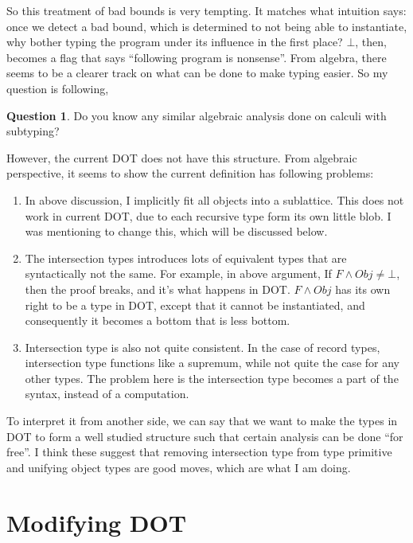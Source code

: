 \documentclass{article}
\theoremstyle{definition}
\newtheorem{question}{Question}
\begin{document}
So this treatment of bad bounds is very tempting. It matches what intuition says: once
we detect a bad bound, which is determined to not being able to instantiate, why
bother typing the program under its influence in the first place? $\bot$, then,
becomes a flag that says ``following program is nonsense''. From algebra, there seems
to be a clearer track on what can be done to make typing easier. So my question is
following,

\begin{question}
Do you know any similar algebraic analysis done on calculi with subtyping?
\end{question}

However, the current DOT does not have this structure. From algebraic perspective, it
seems to show the current definition has following problems:

\begin{enumerate}
\item In above discussion, I implicitly fit all objects into a sublattice. This does
  not work in current DOT, due to each recursive type form its own little blob. I was
  mentioning to change this, which will be discussed below.
  
\item The intersection types introduces lots of equivalent types that are
  syntactically not the same. For example, in above argument, If $F \wedge Obj \neq
  \bot$, then the proof breaks, and it's what happens in DOT. $F \wedge Obj$ has its
  own right to be a type in DOT, except that it cannot be instantiated, and
  consequently it becomes a bottom that is less bottom.
  
\item Intersection type is also not quite consistent. In the case of record types,
  intersection type functions like a supremum, while not quite the case for any other
  types. The problem here is the intersection type becomes a part of the syntax,
  instead of a computation. 
\end{enumerate}

To interpret it from another side, we can say that we want to make the types in DOT to
form a well studied structure such that certain analysis can be done ``for free''. I
think these suggest that removing intersection type from type primitive and unifying
object types are good moves, which are what I am doing.

\section{Modifying DOT}
\end{document}
